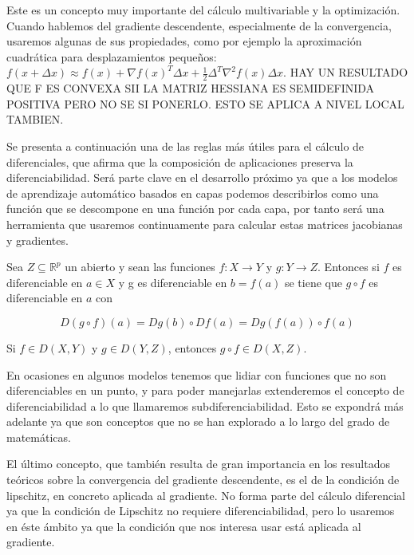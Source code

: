 Este es un concepto muy importante del cálculo multivariable y la optimización. Cuando hablemos del gradiente descendente, especialmente de la convergencia, usaremos algunas de sus propiedades, como por ejemplo la aproximación cuadrática para desplazamientos pequeños: $f(x + \Delta x) \approx f(x) + \nabla f(x)^T \Delta x + \frac{1}{2} \Delta ^T \nabla^2 f(x) \Delta x$. HAY UN RESULTADO QUE F ES CONVEXA SII LA MATRIZ HESSIANA ES SEMIDEFINIDA POSITIVA PERO NO SE SI PONERLO. ESTO SE APLICA A NIVEL LOCAL TAMBIEN.
		


Se presenta a continuación una de las reglas más útiles para el cálculo de diferenciales, que afirma que la composición de aplicaciones preserva la diferenciabilidad. Será parte clave en el desarrollo próximo ya que a los modelos de aprendizaje automático basados en capas podemos describirlos como una función que se descompone en una función por cada capa, por tanto será una herramienta que usaremos continuamente para calcular estas matrices jacobianas y gradientes.

\begin{teorema}
    Sea $Z \subseteq \mathbb{R}^p$ un abierto y sean las funciones $f:X \rightarrow Y$ y $g:Y \rightarrow Z$. Entonces si $f$ es diferenciable en $a \in X$ y g es diferenciable en $b=f(a)$ se tiene que $g \circ f$ es diferenciable en $a$ con

    $$D(g \circ f)(a) = Dg(b) \circ Df(a) = Dg(f(a)) \circ f(a)$$

    \raggedright{Si $f \in D(X, Y)$ y  $g \in D(Y,Z)$, entonces $g \circ f \in D(X, Z)$.}
    
\end{teorema}


En ocasiones en algunos modelos tenemos que lidiar con funciones que no son diferenciables en un punto, y para poder manejarlas extenderemos el concepto de diferenciabilidad a lo que llamaremos subdiferenciabilidad. Esto se expondrá más adelante ya que son conceptos que no se han explorado a lo largo del grado de matemáticas.


El último concepto, que también resulta de gran importancia en los resultados teóricos sobre la convergencia del gradiente descendente, es el de la condición de lipschitz, en concreto aplicada al gradiente. No forma parte del cálculo diferencial ya que la condición de Lipschitz no requiere diferenciabilidad, pero lo usaremos en éste ámbito ya que la condición que nos interesa usar está aplicada al gradiente.

